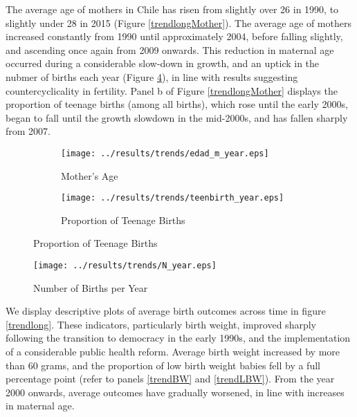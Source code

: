 \documentclass[12pt]{article}
\begin{document}
\begin{spacing}{1.4}
The average age of mothers in Chile has risen from slightly over 26 in
1990, to slightly under 28 in 2015 (Figure \ref{trendlongMother}).  The
average age of mothers increased constantly from 1990 until approximately
2004, before falling slightly, and ascending once again from 2009 onwards.
This reduction in maternal age occurred during a considerable slow-down
in growth, and an uptick in the nubmer of births each year (Figure
\ref{NBirths}), in line with results suggesting countercyclicality in
fertility.  Panel b of Figure \ref{trendlongMother} displays the proportion
of teenage births (among all births), which rose until the early 2000s,
began to fall until the growth slowdown in the mid-2000s, and has fallen
sharply from 2007.
\begin{figure}[htpb!]
  \begin{center}
    \caption{Trends in Maternal Characteristics in Chile}
    \label{trendlongMother}
    \begin{subfigure}{.5\textwidth}
      \centering
      \texttt{[image: ../results/trends/edad\_m\_year.eps]}
      \caption{Mother's Age}
      \label{trendMAge}
    \end{subfigure}%
    \begin{subfigure}{.5\textwidth}
      \centering
      \texttt{[image: ../results/trends/teenbirth\_year.eps]}
      \caption{Proportion of Teenage Births}
      \label{placebo-lbw}
    \end{subfigure}
  \end{center}
\end{figure}

\begin{figure}[htpb!]
  \begin{center}
    \caption{Number of Births per Year}
    \label{NBirths}
    \texttt{[image: ../results/trends/N\_year.eps]}
  \end{center}
\end{figure}

We display descriptive plots of average birth outcomes across time in
figure \ref{trendlong}.  These indicators, particularly birth weight,
improved sharply following the transition to democracy in the early
1990s, and the implementation of a considerable public health reform.
Average birth weight increased by more than 60 grams, and the proportion
of low birth weight babies fell by a full percentage point (refer to
panels \ref{trendBW} and \ref{trendLBW}).  From the year 2000 onwards,
average outcomes have gradually worsened, in line with increases in
maternal age.


\end{spacing}
\end{document}
